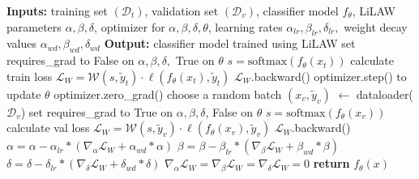 \documentclass{article}
\theoremstyle{plain}
\theoremstyle{definition}
\theoremstyle{remark}
\begin{document}
\begin{algorithm}[h]
\caption{Training with LiLAW}
\begin{algorithmic}[1]
        \STATE \textbf{Inputs:} training set $(\mathcal{D}_{t})$, validation set $(\mathcal{D}_{v})$, classifier model $f_\theta$, LiLAW parameters $\alpha, \beta, \delta$, optimizer for $\alpha, \beta, \delta, \theta$, learning rates $\alpha_{lr}, \beta_{lr}, \delta_{lr},$ weight decay values $\alpha_{wd}, \beta_{wd}, \delta_{wd}$
        \STATE \textbf{Output:} classifier model trained using LiLAW
                    \STATE set requires\_grad to False on $\alpha, \beta, \delta,$ True on $\theta$
                    \STATE $s = \mathrm{softmax}(f_\theta(x_t))$
                    \STATE calculate train loss $\mathcal{L}_{W} = \mathcal{W}(s, \widetilde{y}_t) \cdot \ell(f_{\theta}(x_t), \widetilde{y}_t)$
                    \STATE $\mathcal{L}_{W}$.backward()
                    \STATE optimizer.step() to update $\theta$
                    \STATE optimizer.zero\_grad()
                    \STATE choose a random batch $(x_v, \widetilde{y}_v)$ $\gets$ dataloader($\mathcal{D}_{v}$)
                    \STATE set requires\_grad to True on $\alpha, \beta, \delta$, False on $\theta$
                    \STATE $s = \mathrm{softmax}(f_\theta(x_v))$
                    \STATE calculate val loss $\mathcal{L}_{W} = \mathcal{W}(s, \widetilde{y}_v) \cdot \ell(f_{\theta}(x_v), \widetilde{y}_v)$
                    \STATE $\mathcal{L}_{W}$.backward()
                    \STATE $\alpha = \alpha - \alpha_{lr} * (\nabla_{\alpha}\mathcal{L}_{W} + \alpha_{wd} * \alpha)$
                    \STATE $\beta = \beta - \beta_{lr} * (\nabla_{\beta}\mathcal{L}_{W} + \beta_{wd} * \beta)$
                    \STATE $\delta = \delta - \delta_{lr} * (\nabla_{\delta}\mathcal{L}_{W} + \delta_{wd} * \delta)$
                    \STATE $\nabla_{\alpha}\mathcal{L}_{W} = \nabla_{\beta}\mathcal{L}_{W} = \nabla_{\delta}\mathcal{L}_{W} = 0$
                \ENDFOR
            \ENDFOR
            \STATE \textbf{return} $f_\theta(x)$
\end{algorithmic}
\label{algo}
\end{algorithm}
\end{document}
